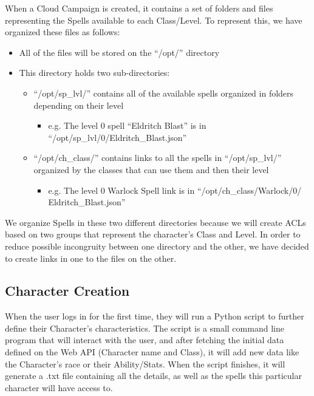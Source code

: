 \documentclass[a4paper,12pt]{report}
\begin{document}
When a Cloud Campaign is created, it contains a set of folders and files representing the Spells available to each Class/Level. To represent this, we have organized these files as follows:
\begin{itemize}
    \item All of the files will be stored on the \enquote{/opt/} directory
    \item This directory holds two sub-directories:
    \begin{itemize}
        \item \enquote{/opt/sp\_lvl/} contains all of the available spells organized in folders depending on their level
        \begin{itemize}
            \item e.g. The level 0 spell \enquote{Eldritch Blast} is in \enquote{/opt/sp\_lvl/0/Eldritch\_Blast.json}
        \end{itemize}
        
        \item \enquote{/opt/ch\_class/} contains links to all the spells in \enquote{/opt/sp\_lvl/} organized by the classes that can use them and then their level
        \begin{itemize}
            \item e.g. The level 0 Warlock Spell link is in \enquote{/opt/ch\_class/Warlock/0/\\ Eldritch\_Blast.json}
        \end{itemize}
    \end{itemize}
\end{itemize}
We organize Spells in these two different directories because we will create ACLs based on two groups that represent the character's Class and Level.
In order to reduce possible incongruity between one directory and the other, we have decided to create links in one to the files on the other. 

\subsection{Character Creation}
\label{subsec:characterCreation}
When the user logs in for the first time, they will run a Python script to further define their Character's characteristics. The script is a small command line program that will interact with the user, and after fetching the initial data defined on the Web API (Character name and Class), it will add new data like the Character's race or their Ability/Stats. When the script finishes, it will generate a .txt file
containing all the details, as well as the spells this particular character will have access to.
\end{document}
